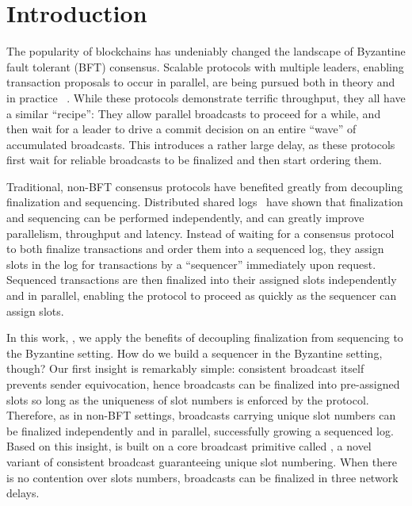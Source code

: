 \section{Introduction}
\label{sec:introduction}

The popularity of blockchains has undeniably changed the landscape of Byzantine fault tolerant (BFT) consensus.
Scalable protocols with multiple leaders, enabling transaction proposals to occur in parallel, are being pursued both in theory and in practice
~\cite{miller2016honey,crain2021red,yang2022dispersedledger, RCC, Mir, ISS, lev2019fairledger, 
 baird2016swirlds, danezis2018blockmania, gkagol2019aleph, danezis2022narwhal, spiegelman2022bullshark, keidar2022cordial, fino}. 
While these protocols demonstrate terrific throughput, they all have a similar ``recipe'': 
They allow parallel broadcasts to proceed for a while, and then wait for a leader to drive a commit decision on an entire ``wave'' of accumulated broadcasts. 
This introduces a rather large delay, as these protocols first wait for reliable broadcasts to be finalized and then start ordering them.

Traditional, non-BFT consensus protocols have benefited greatly from decoupling finalization and sequencing. 
Distributed shared logs~\cite{balakrishnan2012corfu, balakrishnan2013tango, wei2017vcorfu, balakrishnan2020virtual, 10.1145/3477132.3483544}
have shown that finalization and sequencing can be performed independently, and can greatly improve parallelism, throughput and latency. 
Instead of waiting for a consensus protocol to both finalize transactions and order them into a sequenced log, 
they assign slots in the log for transactions by a ``sequencer'' immediately upon request.
Sequenced transactions are then finalized into their assigned slots independently and in parallel, enabling the protocol to proceed as
quickly as the sequencer can assign slots.

In this work, \system, we apply the benefits of decoupling finalization from sequencing to the Byzantine setting. 
How do we build a sequencer in the Byzantine setting, though? Our first insight is remarkably simple:
consistent broadcast itself prevents sender equivocation, 
hence broadcasts can be finalized into pre-assigned slots so long as the uniqueness of slot numbers is enforced by the protocol.
Therefore, as in non-BFT settings, broadcasts carrying unique slot numbers can be finalized independently and in parallel, 
successfully growing a sequenced log.
Based on this insight, \system is built on a core broadcast primitive called \primitive, 
a novel variant of consistent broadcast guaranteeing unique slot numbering.
When there is no contention over slots numbers, \primitive broadcasts can be finalized in three network delays.

